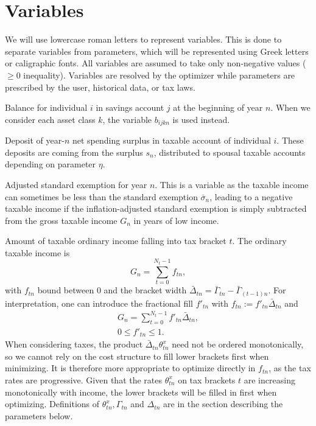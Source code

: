\documentclass[fleqn,12pt]{report}
\begin{document}
\section{Variables}
We will use lowercase roman letters to represent variables. This is done to separate
variables from parameters, which will be represented using
Greek letters or caligraphic fonts. All variables are assumed
to take only non-negative values ($\ge 0$ inequality). Variables are resolved by the optimizer
while parameters are prescribed by the user, historical data, or tax laws.
\begin{description}[leftmargin=4em,style=multiline]
\item [$b_{ijn}$]
	Balance for individual $i$ in savings account $j$ at the beginning of year $n$.
	When we consider each asset class $k$, the variable $b_{ijkn}$ is used instead.
\item [$d_{in}$]
	Deposit of year-$n$ net spending surplus in taxable account of individual $i$.
	These deposits are coming from the surplus $s_n$, distributed to
	spousal taxable accounts depending on parameter $\eta$.
\item [$e_{n}$]
	Adjusted standard exemption for year $n$. This is a variable as the taxable income can
        sometimes be less than the standard exemption $\bar{\sigma}_n$, leading to a
	negative taxable income if the inflation-adjusted standard exemption is simply subtracted
	from the gross taxable income $G_n$ in years of low income.
\item [$f_{t n}$]
	Amount of taxable ordinary income falling into tax bracket $t$. The ordinary taxable income is
	\begin{equation}
		\label{Eq:G_n}
		G_n = \sum_{t=0}^{N_t-1} f_{tn},
	\end{equation}
	with $f_{tn}$ bound between 0 and the bracket width $\bar{\Delta}_{tn} = \bar{\Gamma}_{tn} - \bar{\Gamma}_{(t-1)n}$.
	For interpretation, one can introduce the fractional fill $f'_{tn}$ with
	$f_{tn} := f'_{tn}\bar{\Delta}_{tn}$ and
	\begin{eqnarray}
		G_n = \sum_{t=0}^{N_t-1} f'_{t n}\bar{\Delta}_{t n},\\
		0 \leq f'_{t n} \leq 1.
	\end{eqnarray}
	When considering taxes, the product $\bar{\Delta}_{tn}\theta^x_{tn}$ need not be ordered
	monotonically, so we cannot rely on the cost structure to fill lower brackets first when minimizing.
	It is therefore more appropriate to optimize directly in $f_{tn}$, as the tax rates are progressive.
	Given that the rates $\theta^x_{tn}$ on tax brackets $t$ are increasing monotonically with income,
	the lower brackets will be filled in first when optimizing.
	Definitions of $\theta^x_{tn}, \Gamma_{tn}$ and $\Delta_{tn}$ are in the section describing the parameters below. 


\end{description}
\end{document}
